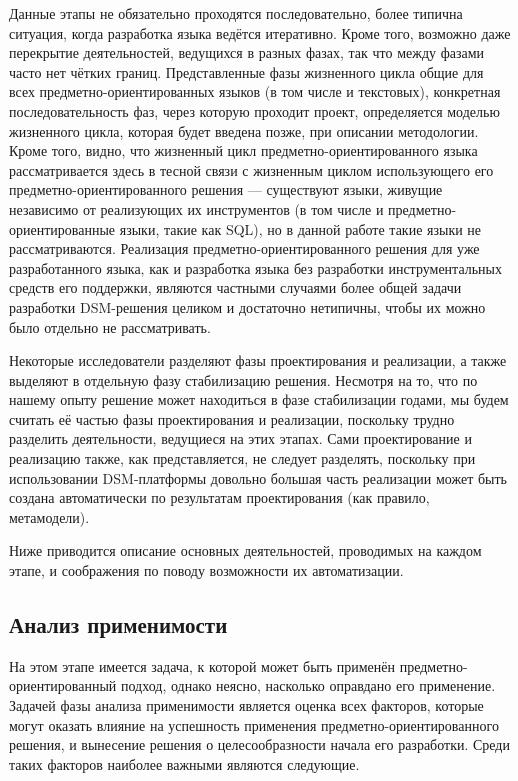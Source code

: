 Данные этапы не обязательно проходятся последовательно, более типична ситуация, когда 
разработка языка ведётся итеративно. Кроме того, возможно даже перекрытие деятельностей, 
ведущихся в разных фазах, так что между фазами часто нет чётких границ. Представленные 
фазы жизненного цикла общие для всех предметно-ориентированных языков (в том числе 
и текстовых), конкретная последовательность фаз, через которую проходит проект, определяется 
моделью жизненного цикла, которая будет введена позже, при описании методологии. Кроме 
того, видно, что жизненный цикл предметно-ориентированного языка рассматривается здесь 
в тесной связи с жизненным циклом использующего его предметно-ориентированного решения --- 
существуют языки, живущие независимо от реализующих их инструментов (в том числе и 
предметно-ориентированные языки, такие как SQL), но в данной работе такие языки не 
рассматриваются. Реализация предметно-ориентированного решения для уже разработанного 
языка, как и разработка языка без разработки инструментальных средств его поддержки, 
являются частными случаями более общей задачи разработки DSM-решения целиком и достаточно 
нетипичны, чтобы их можно было отдельно не рассматривать.

Некоторые исследователи разделяют фазы проектирования и реализации, а также выделяют 
в отдельную фазу стабилизацию решения. Несмотря на то, что по нашему опыту решение 
может находиться в фазе стабилизации годами, мы будем считать её частью фазы проектирования 
и реализации, поскольку трудно разделить деятельности, ведущиеся на этих этапах. Сами 
проектирование и реализацию также, как представляется, не следует разделять, поскольку 
при использовании DSM-платформы довольно большая часть реализации может быть создана 
автоматически по результатам проектирования (как правило, метамодели).

Ниже приводится описание основных деятельностей, проводимых на каждом этапе, и соображения 
по поводу возможности их автоматизации.

\subsection{Анализ применимости}
\label{chapterFeasibilityStudy}
На этом этапе имеется задача, к которой может быть применён предметно-ориентированный 
подход, однако неясно, насколько оправдано его применение. Задачей фазы анализа применимости 
является оценка всех факторов, которые могут оказать влияние на успешность применения 
предметно-ориентированного решения, и вынесение решения о целесообразности начала 
его разработки. Среди таких факторов наиболее важными являются следующие.

